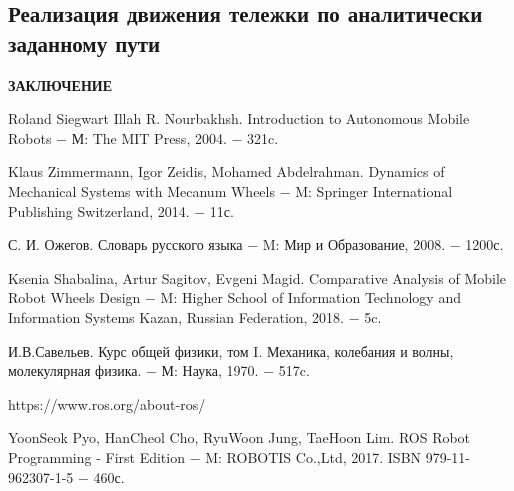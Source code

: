 \documentclass[oneside,final,14pt]{extreport}
\begin{document}
\subsection{Реализация движения тележки по аналитически заданному пути}

\newpage
{}
\begin{center}
\bfseries ЗАКЛЮЧЕНИЕ
\end{center}

\newpage
\begin{thebibliography}{0}

Roland Siegwart
Illah R. Nourbakhsh.
Introduction to Autonomous Mobile Robots
$-$ М: The MIT Press, 2004. $-$ 321c.

Klaus Zimmermann, Igor Zeidis, Mohamed Abdelrahman.
Dynamics of Mechanical Systems
with Mecanum Wheels
$-$ M:  Springer International Publishing Switzerland, 2014. $-$ 11с.

С. И. Ожегов.
Словарь русского языка
$-$ M: Мир и Образование, 2008. $-$ 1200с.


Ksenia Shabalina, Artur Sagitov, Evgeni Magid.
Comparative Analysis of Mobile Robot Wheels
Design
$-$ M: Higher School of Information Technology and Information Systems
Kazan, Russian Federation, 2018. $-$ 5c.

И.В.Савельев.
Курс общей физики, том I.
Механика, колебания и волны, молекулярная физика.
$-$ М: Наука, 1970. $-$ 517c.

https://www.ros.org/about-ros/

YoonSeok Pyo, HanCheol Cho, RyuWoon Jung, TaeHoon Lim.
ROS Robot Programming - First Edition
$-$ M:  ROBOTIS Co.,Ltd, 2017. ISBN
 979-11-962307-1-5
 $-$ 460с.

\end{thebibliography}
\end{document}
